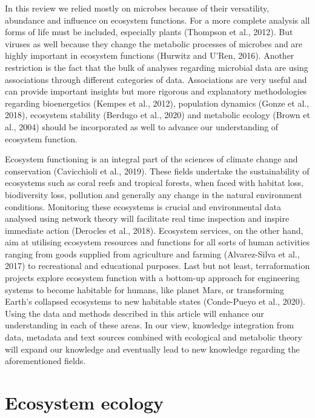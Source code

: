 In this review we relied mostly on microbes because of their versatility, abundance and influence on ecosystem functions. For a more complete analysis all forms of life must be included, especially plants (Thompson et al., 2012). But viruses as well because they change the metabolic processes of microbes and are highly important in ecosystem functions (Hurwitz and U’Ren, 2016). Another restriction is the fact that the bulk of analyses regarding microbial data are using associations through different categories of data. Associations are very useful and can provide important insights but more rigorous and explanatory methodologies regarding bioenergetics (Kempes et al., 2012), population dynamics (Gonze et al., 2018), ecosystem stability (Berdugo et al., 2020) and metabolic ecology (Brown et al., 2004) should be incorporated as well to advance our understanding of ecosystem function.

Ecosystem functioning is an integral part of the sciences of climate change and conservation (Cavicchioli et al., 2019). These fields undertake the sustainability of ecosystems such as coral reefs and tropical forests, when faced with habitat loss, biodiversity loss, pollution and generally any change in the natural environment conditions. Monitoring these ecosystems is crucial and environmental data analysed using network theory will facilitate real time inspection and inspire immediate action (Derocles et al., 2018). Ecosystem services, on the other hand, aim at utilising ecosystem resources and functions for all sorts of human activities ranging from goods supplied from agriculture and farming (Alvarez-Silva et al., 2017) to recreational and educational purposes. Last but not least, terraformation projects explore ecosystem function with a bottom-up approach for engineering systems to become habitable for humans, like planet Mars, or transforming Earth's collapsed ecosystems to new habitable states (Conde-Pueyo et al., 2020). Using the data and methods described in this article will enhance our understanding in each of these areas. In our view, knowledge integration from data, metadata and text sources combined with ecological and metabolic theory will expand our knowledge and eventually lead to new knowledge regarding the aforementioned fields.

\section{Ecosystem ecology}
\label{sec:intro-ecosystem}

